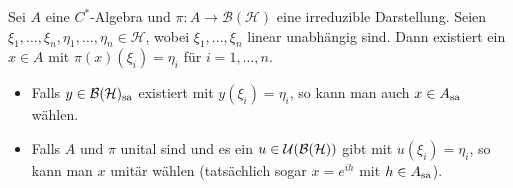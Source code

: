 \begin{satz}[{name={Kadisons Transitivitätssatz}},label=satz:716]
	Sei $A$ eine $C^*$-Algebra und $\pi \colon A \to \mathcal{B}(\mathcal{H})$ eine irreduzible Darstellung.
	Seien $\xi_1,\ldots ,\xi_n, \eta_1, \ldots , \eta_n \in \mathcal{H}$, wobei $\xi_1,\ldots ,\xi_n$ linear unabhängig sind.
	Dann existiert ein $x \in A$ mit $\pi(x)(\xi_i) = \eta_i$ für $i=1,\ldots ,n$.
	\begin{itemize}
		\item Falls $y \in \mathcal{B}(\mathcal{H})_{\mathrm{sa}}$ existiert mit $y(\xi_i)=\eta_i$, so kann man auch $x \in A_{\mathrm{sa}}$ wählen.
		\item Falls $A$ und $\pi$ unital sind und es ein $u \in \mathcal{U} \enbrace*{\mathcal{B}(\mathcal{H})}$ gibt mit $u(\xi_i)=\eta_i$, so kann man $x$ unitär wählen (tatsächlich sogar $x=e^{i h}$ mit $h \in A_{\mathrm{sa}}$).
	\end{itemize}
\end{satz}
